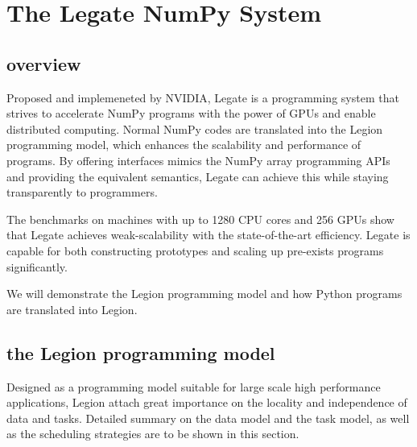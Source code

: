 \documentclass{article}
\newenvironment{newSec}[1]{
	\section{#1}
	\lhead{#1}
}{ \newpage }
\newenvironment{newSubsec}[1]{
	\subsection{#1}
}{}
\begin{document}
\begin{newSec}{The Legate NumPy System}
	\begin{newSubsec}{overview}
		Proposed and implemeneted by NVIDIA, Legate\cite{Legate} is a programming system that strives to accelerate NumPy programs with the power of GPUs and enable distributed computing.
		Normal NumPy codes are translated into the Legion\cite{Legion} programming model, which enhances the scalability and performance of programs.
		By offering interfaces mimics the NumPy array programming APIs and providing the equivalent semantics, Legate can achieve this while staying transparently to programmers.\par
		The benchmarks on machines with up to 1280 CPU cores and 256 GPUs show that Legate achieves weak-scalability with the state-of-the-art efficiency.
		Legate is capable for both constructing prototypes and scaling up pre-exists programs significantly.\par
		We will demonstrate the Legion programming model and how Python programs are translated into Legion.
	\end{newSubsec}

	\begin{newSubsec}{the Legion programming model}
		Designed as a programming model suitable for large scale high performance applications, Legion\cite{Legion}
		attach great importance on the locality and independence of data and tasks.
		Detailed summary on the data model and the task model, as well as the scheduling strategies are to be shown in this section.


\end{newSubsec}
\end{newSec}
\end{document}
